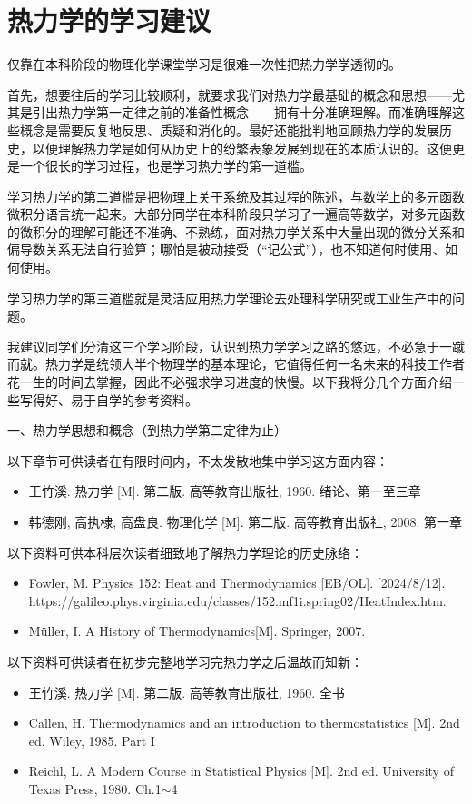 \documentclass[main.tex]{subfiles}
\begin{document}
\section{热力学的学习建议}\label{I.1 learning_advices}
仅靠在本科阶段的物理化学课堂学习是很难一次性把热力学学透彻的。

首先，想要往后的学习比较顺利，就要求我们对热力学最基础的概念和思想——尤其是引出热力学第一定律之前的准备性概念——拥有十分准确理解。而准确理解这些概念是需要反复地反思、质疑和消化的。最好还能批判地回顾热力学的发展历史，以便理解热力学是如何从历史上的纷繁表象发展到现在的本质认识的。这便更是一个很长的学习过程，也是学习热力学的第一道槛。

学习热力学的第二道槛是把物理上关于系统及其过程的陈述，与数学上的多元函数微积分语言统一起来。大部分同学在本科阶段只学习了一遍高等数学，对多元函数的微积分的理解可能还不准确、不熟练，面对热力学关系中大量出现的微分关系和偏导数关系无法自行验算；哪怕是被动接受（“记公式”），也不知道何时使用、如何使用。

学习热力学的第三道槛就是灵活应用热力学理论去处理科学研究或工业生产中的问题。

我建议同学们分清这三个学习阶段，认识到热力学学习之路的悠远，不必急于一蹴而就。热力学是统领大半个物理学的基本理论，它值得任何一名未来的科技工作者花一生的时间去掌握，因此不必强求学习进度的快慢。以下我将分几个方面介绍一些写得好、易于自学的参考资料。

一、热力学思想和概念（到热力学第二定律为止）

以下章节可供读者在有限时间内，不太发散地集中学习这方面内容：
\begin{itemize}
  \item 王竹溪. 热力学 [M]. 第二版. 高等教育出版社, 1960. 绪论、第一至三章
  \item 韩德刚, 高执棣, 高盘良. 物理化学 [M]. 第二版. 高等教育出版社, 2008. 第一章
\end{itemize}
以下资料可供本科层次读者细致地了解热力学理论的历史脉络：
\begin{itemize}
  \item Fowler, M. Physics 152: Heat and Thermodynamics [EB/OL]. [2024/8/12]. \\https://galileo.phys.virginia.edu/classes/152.mf1i.spring02/HeatIndex.htm.
  \item Müller, I. A History of Thermodynamics[M]. Springer, 2007.
\end{itemize}
以下资料可供读者在初步完整地学习完热力学之后温故而知新：
\begin{itemize}
  \item 王竹溪. 热力学 [M]. 第二版. 高等教育出版社, 1960. 全书
  \item Callen, H. Thermodynamics and an introduction to thermostatistics [M]. 2nd ed. Wiley, 1985. Part I
  \item Reichl, L. A Modern Course in Statistical Physics [M]. 2nd ed. University of Texas Press, 1980. Ch.1$\sim$4
\end{itemize}
\end{document}
